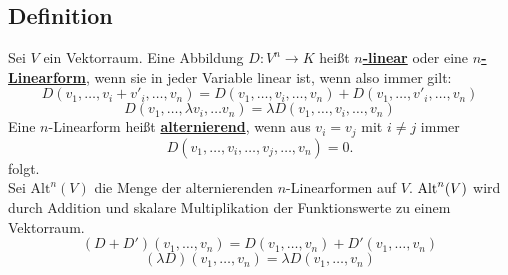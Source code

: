 \subsection{Definition} %
\label{sub:definition}
Sei $V$ ein Vektorraum. Eine Abbildung $D: V^n \to K$ heißt \underline{\textbf{$n$-linear}} oder eine \underline{\textbf{$n$-Linearform}}, wenn sie in jeder
Variable linear ist, wenn also immer gilt:
\[
	D(v_1, \ldots , v_i + v'_i , \ldots , v_n) = D(v_1, \ldots , v_i , \ldots , v_n) + D(v_1, \ldots , v'_i , \ldots , v_n)
\]
\[
	D(v_1, \ldots , \lambda v_i , \ldots v_n) = \lambda D(v_1, \ldots , v_i , \ldots , v_n)
\]
Eine $n$-Linearform heißt \underline{\textbf{alternierend}}, wenn aus $v_i = v_j$ mit $i \not= j$ immer 
\[
	D(v_1, \ldots , v_i , \ldots , v_j , \ldots , v_n)=0.
\]
folgt. \\
Sei $\text{Alt}^n (V)$ die Menge der alternierenden $n$-Linearformen auf $V$. $\operatorname{Alt}^n (V)$ wird durch Addition und skalare Multiplikation der Funktionswerte zu einem
Vektorraum.
\[
	(D+D') (v_1, \ldots , v_n) = D(v_1, \ldots , v_n) + D'(v_1, \ldots , v_n)
\]
\[
	(\lambda D) (v_1, \ldots , v_n) = \lambda D(v_1, \ldots , v_n)
\]


